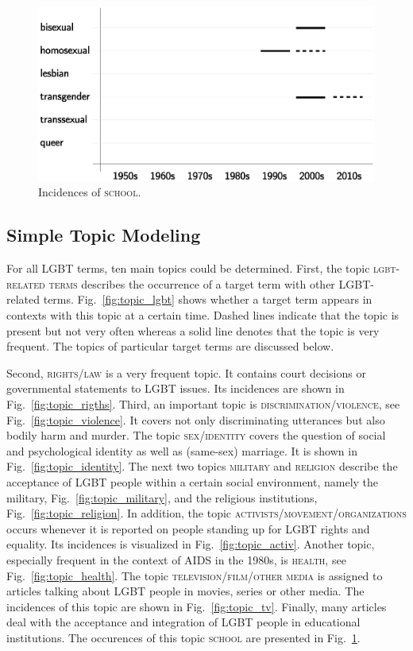\documentclass[10pt,a4paper,twocolumn]{scrartcl}
\begin{document}
\begin{figure}
\begin{minipage}{0.48\textwidth}
\includegraphics[width=\columnwidth]{figures/topic_school}
\caption{Incidences of \textsc{school}.} \label{fig:topic_school}
\end{minipage}
\end{figure}

\subsection{Simple Topic Modeling}
For all LGBT terms, ten main topics could be determined. First, the topic \textsc{lgbt-related terms} describes the occurrence of a target term with other LGBT-related terms. Fig.~\ref{fig:topic_lgbt} shows whether a target term appears in contexts with this topic at a certain time. Dashed lines indicate that the topic is present but not very often whereas a solid line denotes that the topic is very frequent. The topics of particular target terms are discussed below.

Second, \textsc{rights/law} is a very frequent topic. It contains court decisions or governmental statements to LGBT issues. Its incidences are shown in Fig.~\ref{fig:topic_rigths}. Third, an important topic is \textsc{discrimination/violence}, see Fig.~\ref{fig:topic_violence}. It covers not only discriminating utterances but also bodily harm and murder. The topic \textsc{sex/identity} covers the question of social and psychological identity as well as (same-sex) marriage. It is shown in Fig.~\ref{fig:topic_identity}. The next two topics \textsc{military} and \textsc{religion} describe the acceptance of LGBT people within a certain social environment, namely the military, Fig.~\ref{fig:topic_military}, and the religious institutions, Fig.~\ref{fig:topic_religion}. In addition, the topic \textsc{activists/movement/organizations} occurs whenever it is reported on people standing up for LGBT rights and equality. Its incidences is visualized in Fig.~\ref{fig:topic_activ}. Another topic, especially frequent in the context of AIDS in the 1980s, is \textsc{health}, see Fig.~\ref{fig:topic_health}. The topic \textsc{television/film/other media} is assigned to articles talking about LGBT people in movies, series or other media. The incidences of this topic are shown in Fig.~\ref{fig:topic_tv}. Finally, many articles deal with the acceptance and integration of LGBT people in educational institutions. The occurences of this topic \textsc{school} are presented in Fig.~\ref{fig:topic_school}.
\end{document}
